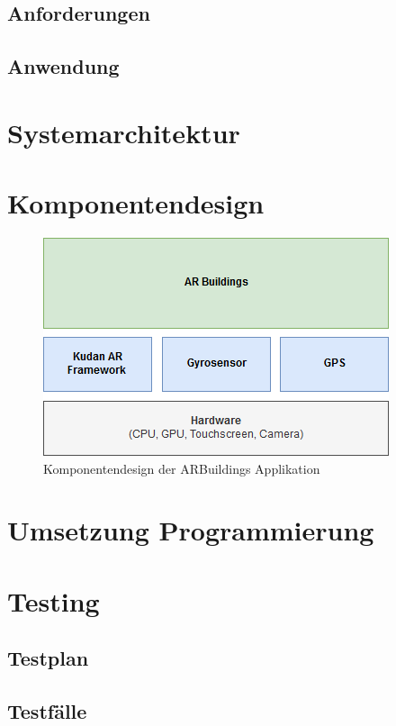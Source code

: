 \documentclass[a4paper]{scrreprt}
\begin{document}
\subsection{Anforderungen}

\subsection{Anwendung}

\section{Systemarchitektur}

\newpage
\section{Komponentendesign}

\begin{figure}[h!]
	\centering
	\includegraphics[width=0.7\linewidth, keepaspectratio]{Komponentendesign}
	\caption{Komponentendesign der ARBuildings Applikation}
\end{figure}

\section{Umsetzung Programmierung}

\section{Testing}

\subsection{Testplan}

\subsection{Testfälle}
\end{document}
